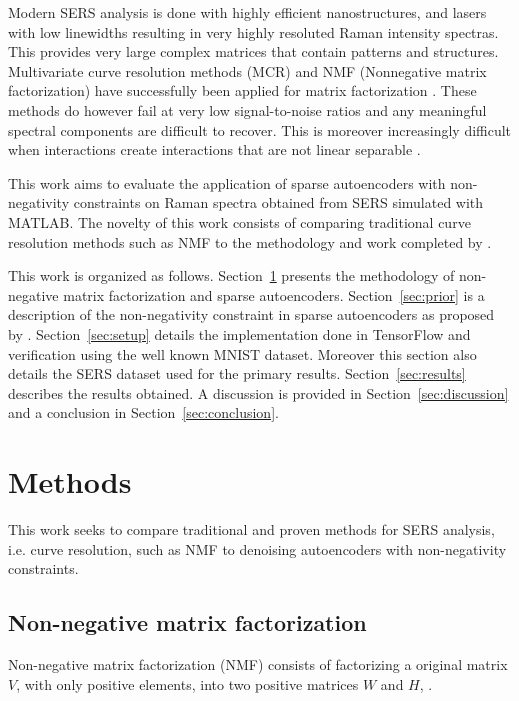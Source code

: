 \documentclass{article}
\begin{document}
Modern SERS analysis is done with highly efficient nanostructures, and lasers with low linewidths resulting in very highly resoluted Raman intensity spectras. This provides very large complex matrices that contain patterns and structures. Multivariate curve resolution methods (MCR) and NMF (Nonnegative matrix factorization) have successfully been applied for matrix factorization \cite{Sajda}. These methods do however fail at very low signal-to-noise ratios and any meaningful spectral components are difficult to recover. This is moreover increasingly difficult when interactions create interactions that are not linear separable \cite{Alstrom2017}.

This work aims to evaluate the application of sparse autoencoders with non-negativity constraints on Raman spectra obtained from SERS simulated with MATLAB. The novelty of this work consists of comparing traditional curve resolution methods such as NMF to the methodology and work completed by \cite{Hosseini-Asl2016}.

This work is organized as follows. Section~\ref{sec:methods} presents the methodology of non-negative matrix factorization and sparse autoencoders. Section~\ref{sec:prior} is a description of the non-negativity constraint in sparse autoencoders as proposed by \cite{Hosseini-Asl2016}. Section~\ref{sec:setup} details the implementation done in TensorFlow and verification using the well known MNIST dataset. Moreover this section also details the SERS dataset used for the primary results. Section~\ref{sec:results} describes the results obtained. A discussion is provided in Section~\ref{sec:discussion} and a conclusion in Section~\ref{sec:conclusion}.


\section{Methods}
\label{sec:methods}

This work seeks to compare traditional and proven methods for SERS analysis, i.e. curve resolution, such as NMF to denoising autoencoders with non-negativity constraints. 

\subsection{Non-negative matrix factorization}

Non-negative matrix factorization (NMF) consists of factorizing a original matrix $V$, with only positive elements, into two positive matrices $W$ and $H$, \cite{Seung1999}.
\end{document}
